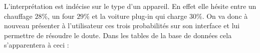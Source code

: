 \documentclass[10pt,a4paper]{article}
\begin{document}
\begin{table}[h!]
\caption{Identification/interprétation des types d'appareils}
\end{table}

\newpage
L'interprétation est indécise sur le type d'un appareil. En effet elle hésite entre un chauffage $28\%$, un four $29\%$ et la voiture plug-in qui charge $30\%$. On va donc à nouveau présenter à l'utilisateur ces trois probabilités sur son interface et lui permettre de résoudre le doute. Dans les tables de la base de données cela s'apparentera à ceci :\\
\end{document}

